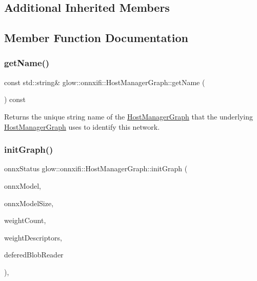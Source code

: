 \subsection*{Additional Inherited Members}


\subsection{Member Function Documentation}
\mbox{\label{classglow_1_1onnxifi_1_1_host_manager_graph_acd6bb7414badffcd5a82b57fd4b97149}} 
\subsubsection{\texorpdfstring{get\+Name()}{getName()}}
{\footnotesize\ttfamily const std\+::string\& glow\+::onnxifi\+::\+Host\+Manager\+Graph\+::get\+Name (\begin{DoxyParamCaption}{ }\end{DoxyParamCaption}) const\hspace{0.3cm}{\ttfamily [inline]}}

\begin{DoxyReturn}{Returns}
the unique string name of the \hyperlink{classglow_1_1onnxifi_1_1_host_manager_graph}{Host\+Manager\+Graph} that the underlying \hyperlink{classglow_1_1onnxifi_1_1_host_manager_graph}{Host\+Manager\+Graph} uses to identify this network. 
\end{DoxyReturn}
\mbox{\label{classglow_1_1onnxifi_1_1_host_manager_graph_a58234ef078e7db198825b214881fe7ef}} 
\subsubsection{\texorpdfstring{init\+Graph()}{initGraph()}}
{\footnotesize\ttfamily onnx\+Status glow\+::onnxifi\+::\+Host\+Manager\+Graph\+::init\+Graph (\begin{DoxyParamCaption}\item[{const void $\ast$}]{onnx\+Model,  }\item[{size\+\_\+t}]{onnx\+Model\+Size,  }\item[{uint32\+\_\+t}]{weight\+Count,  }\item[{const onnx\+Tensor\+Descriptor\+V1 $\ast$}]{weight\+Descriptors,  }\item[{void $\ast$}]{defered\+Blob\+Reader }\end{DoxyParamCaption})\hspace{0.3cm}{\ttfamily [override]}, {\ttfamily [virtual]}}

